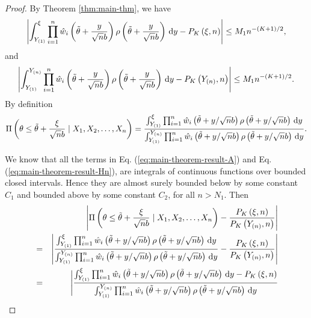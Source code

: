 \begin{proof}
By Theorem \ref{thm:main-thm}, we have 
\begin{equation}
\left|\int_{Y_{\left(1\right)}}^{\xi}\prod_{i=1}^{n}\hat{w}_{i}\left(\tilde{\theta}+\frac{y}{\sqrt{n}b}\right)\rho\left(\tilde{\theta}+\frac{y}{\sqrt{n}b}\right)\,\mathrm{d} y-P_{K}\left(\xi,n\right)\right|\le M_{1}n^{-\left(K+1\right)/2},\label{eq:main-theorem-result-A}
\end{equation}
and 
\begin{equation}
\left|\int_{Y_{\left(1\right)}}^{Y_{\left(n\right)}}\prod_{i=1}^{n}\hat{w}_{i}\left(\tilde{\theta}+\frac{y}{\sqrt{n}b}\right)\rho\left(\tilde{\theta}+\frac{y}{\sqrt{n}b}\right)\,\mathrm{d} y-P_{K}\left(Y_{\left(n\right)},n\right)\right|\le M_{1}n^{-\left(K+1\right)/2}.\label{eq:main-theorem-result-Hn}
\end{equation}
By definition 
\[
\Pi\left(\theta\le\tilde{\theta}+\frac{\xi}{\sqrt{n}b}\mid X_{1},X_{2},\ldots,X_{n}\right)=\frac{\int_{Y_{\left(1\right)}}^{\xi}\prod_{i=1}^{n}\hat{w}_{i}\left(\tilde{\theta}+y/\sqrt{n}b\right)\rho\left(\tilde{\theta}+y/\sqrt{n}b\right)\,\mathrm{d} y}{\int_{Y_{\left(1\right)}}^{Y_{\left(n\right)}}\prod_{i=1}^{n}\hat{w}_{i}\left(\tilde{\theta}+y/\sqrt{n}b\right)\rho\left(\tilde{\theta}+y/\sqrt{n}b\right)\,\mathrm{d} y}.
\]

We know that all the terms in Eq. (\ref{eq:main-theorem-result-A}) and Eq. (\ref{eq:main-theorem-result-Hn}),
are integrals of continuous functions over bounded closed intervals.
Hence they are almost surely bounded below by some constant $C_{1}$ and
bounded above by some constant $C_{2}$, for all $n>N_{1}$. Then
\begin{eqnarray}
 &  & \left|\Pi\left(\theta\le\tilde{\theta}+\frac{\xi}{\sqrt{n}b}\mid X_{1},X_{2},\ldots,X_{n}\right)-\frac{P_{K}\left(\xi,n\right)}{P_{K}\left(Y_{\left(n\right)},n\right)}\right|\nonumber \\
 & = & \left|\frac{\int_{Y_{\left(1\right)}}^{\xi}\prod_{i=1}^{n}\hat{w}_{i}\left(\tilde{\theta}+y/\sqrt{n}b\right)\rho\left(\tilde{\theta}+y/\sqrt{n}b\right)\diff y}{\int_{Y_{\left(1\right)}}^{Y_{\left(n\right)}}\prod_{i=1}^{n}\hat{w}_{i}\left(\tilde{\theta}+y/\sqrt{n}b\right)\rho\left(\tilde{\theta}+y/\sqrt{n}b\right)\diff y}-\frac{P_{K}\left(\xi,n\right)}{P_{K}\left(Y_{\left(n\right)},n\right)}\right|\nonumber \\
 & = & \Bigg|\frac{\int_{Y_{\left(1\right)}}^{\xi}\prod_{i=1}^{n}\hat{w}_{i}\left(\tilde{\theta}+y/\sqrt{n}b\right)\rho\left(\tilde{\theta}+y/\sqrt{n}b\right)\diff y-P_{K}\left(\xi,n\right)}{\int_{Y_{\left(1\right)}}^{Y_{\left(n\right)}}\prod_{i=1}^{n}\hat{w}_{i}\left(\tilde{\theta}+y/\sqrt{n}b\right)\rho\left(\tilde{\theta}+y/\sqrt{n}b\right)\diff y}\nonumber \\

\end{eqnarray}
\end{proof}
